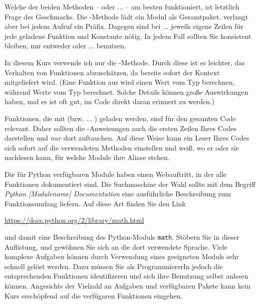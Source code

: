 \begin{hintbox}
Welche der beiden Methoden --  oder  ...  -- am besten funktioniert, ist letztlich Frage des Geschmacks. Die -Methode lädt ein Modul als Gesamtpaket, verlangt aber bei jedem Aufruf ein Präfix. Dagegen sind bei  ...  jeweils eigene Zeilen für jede geladene Funktion und Konstante nötig. In jedem Fall sollten Sie konsistent bleiben, \ie nur entweder  oder  ...  benutzen.

In diesem Kurs verwende ich nur die -Methode. Durch diese ist es leichter, das Verhalten von Funktionen abzuschätzen, da bereits sofort der Kontext mitgeliefert wird. (Eine Funktion aus  wird \idR einen Wert vom Typ  berechnen, während  \idR Werte vom Typ  berechnet. Solche Details können große Auswirkungen haben, und es ist oft gut, im Code direkt daran erinnert zu werden.)
\end{hintbox}

\begin{hintbox}
Funktionen, die mit  (bzw.  ... ) geladen werden, sind \idR für den gesamten Code relevant. Daher sollten die -Anweisungen auch die ersten Zeilen Ihres Codes darstellen und \emph{nur} dort auftauchen. Auf diese Weise kann ein Leser Ihres Codes sich sofort auf  die verwendeten Methoden einstellen und weiß, wo er oder sie nachlesen kann, für welche Module ihre Aliase stehen.
\end{hintbox}

Die für Python verfügbaren Module haben \idR einen Webauftritt, in der alle Funktionen dokumentiert sind. Die Suchmaschine der Wahl sollte mit dem Begriff \emph{Python [Modulename] Documentation} eine ausführliche Beschreibung zum Funktionsumfang liefern. Auf diese Art finden Sie \ua den Link
\begin{center}
	\url{https://docs.python.org/2/library/math.html}
\end{center}
und damit eine Beschreibung des Python-Moduls \texttt{math}. Stöbern Sie in dieser Auflistung, und gewöhnen Sie sich an die dort verwendete Sprache. Viele komplexe Aufgaben können durch Verwendung eines geeigneten Moduls sehr schnell gelöst werden. Dazu müssen Sie als ProgrammiererIn jedoch die entsprechenden Funktionen identifizeren und sich ihre Benutzung selbst anlesen können. Angesichts der Vielzahl an Aufgaben und verfügbaren Pakete kann kein Kurs erschöpfend auf die verfügaren Funktionen eingehen.


